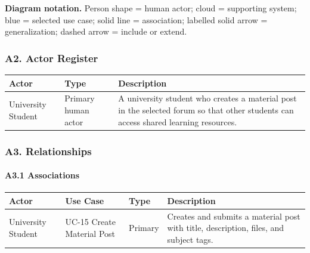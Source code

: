 \documentclass[12pt]{article}
\renewcommand{\baselinestretch}{1.5}
\begin{document}
\textbf{Diagram notation.} Person shape = human actor; cloud = supporting system; blue = selected use case; solid line = association; labelled solid arrow = generalization; dashed arrow = include or extend.
\par\medskip

\hypertarget{sec:a2-actor-register}{}
\subsubsection*{A2. Actor Register}
\par\medskip

\begingroup
\small
\renewcommand{\baselinestretch}{1.0}\selectfont
\renewcommand{\arraystretch}{1.15}
\setlength{\tabcolsep}{6pt}
\begin{longtable}{|>{\raggedright\arraybackslash}p{}|>{\raggedright\arraybackslash}p{}|>{\raggedright\arraybackslash}p{}|}
\hline
\textbf{Actor} & \textbf{Type} & \textbf{Description} \\ \hline
\endhead
University Student & Primary human actor & A university student who creates a material post in the selected forum so that other students can access shared learning resources. \\ \hline
\end{longtable}
\endgroup
\par\medskip

\hypertarget{sec:a3-relationships}{}
\subsubsection*{A3. Relationships}
\par\medskip

\hypertarget{sec:a3-1-associations}{}
\paragraph*{A3.1 Associations}
\par\medskip

\begingroup
\small
\renewcommand{\baselinestretch}{1.0}\selectfont
\renewcommand{\arraystretch}{1.15}
\setlength{\tabcolsep}{6pt}
\begin{longtable}{|>{\raggedright\arraybackslash}p{}|>{\raggedright\arraybackslash}p{}|>{\raggedright\arraybackslash}p{}|>{\raggedright\arraybackslash}p{}|}
\hline
\textbf{Actor} & \textbf{Use Case} & \textbf{Type} & \textbf{Description} \\ \hline
\endhead
University Student & UC-15 Create Material Post & Primary & Creates and submits a material post with title, description, files, and subject tags. \\ \hline
\end{longtable}
\endgroup
\par\medskip
\end{document}
